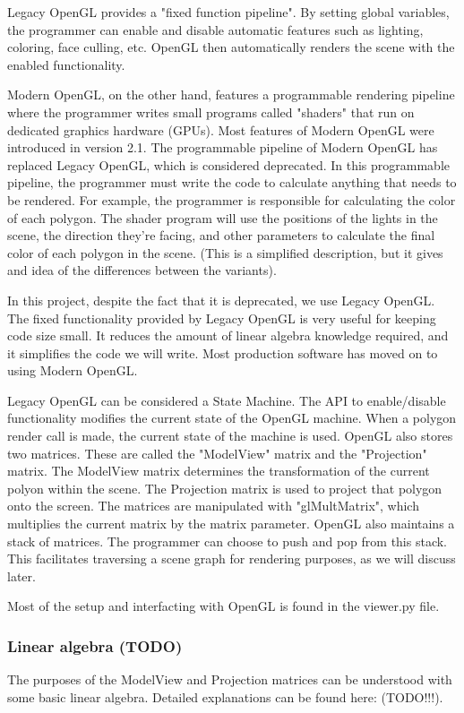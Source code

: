 \documentclass[11pt,draft]{article}
\begin{document}
Legacy OpenGL provides a "fixed function pipeline". By setting global variables, the programmer can enable and disable automatic features such
as lighting, coloring, face culling, etc. OpenGL then automatically renders the scene with the enabled functionality.

Modern OpenGL, on the other hand, features a programmable rendering pipeline where the programmer writes small programs called "shaders" that
run on dedicated graphics hardware (GPUs). Most features of Modern OpenGL were introduced in version 2.1. The programmable
pipeline of Modern OpenGL has replaced Legacy OpenGL, which is considered deprecated. In this programmable pipeline, the programmer must
write the code to calculate anything that needs to be rendered. For example, the programmer is responsible for calculating the color of each
polygon. The shader program will use the positions of the lights in the scene, the direction they're facing, and other parameters to calculate
the final color of each polygon in the scene. (This is a simplified description, but it gives and idea of the differences between the variants).

In this project, despite the fact that it is deprecated, we use Legacy OpenGL. The fixed functionality provided by Legacy OpenGL is very useful for keeping
code size small. It reduces the amount of linear algebra knowledge required, and it simplifies the code we will write. Most production
software has moved on to using Modern OpenGL.

Legacy OpenGL can be considered a State Machine. The API to enable/disable functionality modifies the current state of the OpenGL machine.
When a polygon render call is made, the current state of the machine is used.
OpenGL also stores two matrices.  These are called the "ModelView" matrix and the "Projection" matrix.
The ModelView matrix determines the transformation of the current polyon within the scene. The Projection matrix is used to project that polygon onto the screen.
The matrices are manipulated with "glMultMatrix", which multiplies the current matrix by the matrix parameter.
OpenGL also maintains a stack of matrices. The programmer can choose to push and pop from this stack. This facilitates traversing a scene graph for rendering purposes, as we will discuss later.

Most of the setup and interfacting with OpenGL is found in the viewer.py file.

\subsubsection{Linear algebra (TODO)}
The purposes of the ModelView and Projection matrices can be understood with some basic linear algebra. Detailed explanations can be found here: (TODO!!!).
\end{document}
